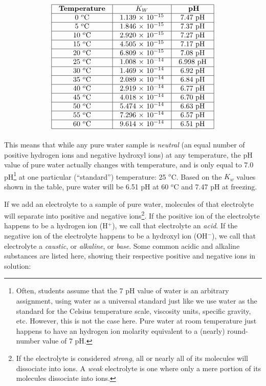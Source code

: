 $$\vbox{\offinterlineskip
\halign{\strut
\vrule \quad\hfil # \ \hfil & 
\vrule \quad\hfil # \ \hfil & 
\vrule \quad\hfil # \ \hfil \vrule \cr
\noalign{\hrule}
%
\textbf{Temperature} & $K_W$ & \textbf{pH}\cr
%
\noalign{\hrule}
%
0 $^{o}$C & 1.139 $\times$ $10^{-15}$ & 7.47 pH \cr
%
\noalign{\hrule}
%
5 $^{o}$C & 1.846 $\times$ $10^{-15}$ & 7.37 pH \cr
%
\noalign{\hrule}
%
10 $^{o}$C & 2.920 $\times$ $10^{-15}$ & 7.27 pH \cr
%
\noalign{\hrule}
%
15 $^{o}$C & 4.505 $\times$ $10^{-15}$ & 7.17 pH \cr
%
\noalign{\hrule}
%
20 $^{o}$C & 6.809 $\times$ $10^{-15}$ & 7.08 pH \cr
%
\noalign{\hrule}
%
25 $^{o}$C & 1.008 $\times$ $10^{-14}$ & 6.998 pH \cr
%
\noalign{\hrule}
%
30 $^{o}$C & 1.469 $\times$ $10^{-14}$ & 6.92 pH \cr
%
\noalign{\hrule}
%
35 $^{o}$C & 2.089 $\times$ $10^{-14}$ & 6.84 pH \cr
%
\noalign{\hrule}
%
40 $^{o}$C & 2.919 $\times$ $10^{-14}$ & 6.77 pH \cr
%
\noalign{\hrule}
%
45 $^{o}$C & 4.018 $\times$ $10^{-14}$ & 6.70 pH \cr
%
\noalign{\hrule}
%
50 $^{o}$C & 5.474 $\times$ $10^{-14}$ & 6.63 pH \cr
%
\noalign{\hrule}
%
55 $^{o}$C & 7.296 $\times$ $10^{-14}$ & 6.57 pH \cr
%
\noalign{\hrule}
%
60 $^{o}$C & 9.614 $\times$ $10^{-14}$ & 6.51 pH \cr
%
\noalign{\hrule}
} %
}$$ %

This means that while any pure water sample is \textit{neutral} (an equal number of positive hydrogen ions and negative hydroxyl ions) at any temperature, the pH value of pure water actually changes with temperature, and is only equal to 7.0 pH\footnote{Often, students assume that the 7 pH value of water is an arbitrary assignment, using water as a universal standard just like we use water as the standard for the Celsius temperature scale, viscosity units, specific gravity, etc.  However, this is not the case here.  Pure water at room temperature just happens to have an hydrogen ion molarity equivalent to a (nearly) round-number value of 7 pH.} at one particular (``standard'') temperature: 25 $^{o}$C.  Based on the $K_w$ values shown in the table, pure water will be 6.51 pH at 60 $^{o}$C and 7.47 pH at freezing.

\vskip 10pt

\filbreak

If we add an electrolyte to a sample of pure water, molecules of that electrolyte will separate into positive and negative ions\footnote{If the electrolyte is considered \textit{strong}, all or nearly all of its molecules will dissociate into ions.  A \textit{weak} electrolyte is one where only a mere portion of its molecules dissociate into ions.}.  If the positive ion of the electrolyte happens to be a hydrogen ion (H$^{+}$), we call that electrolyte an \textit{acid}.  If the negative ion of the electrolyte happens to be a hydroxyl ion (OH$^{-}$), we call that electrolyte a \textit{caustic}, or \textit{alkaline}, or \textit{base}.  Some common acidic and alkaline substances are listed here, showing their respective positive and negative ions in solution:     

